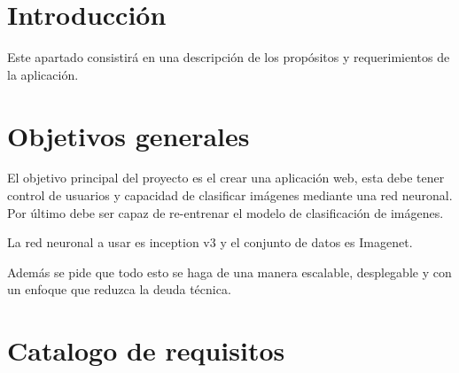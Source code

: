 
\section{Introducción}
Este apartado consistirá en una descripción de los propósitos y requerimientos de la aplicación.

\section{Objetivos generales}
El objetivo principal del proyecto es el crear una aplicación web, esta debe tener control de usuarios y capacidad de clasificar imágenes mediante una red neuronal. Por último debe ser capaz de re-entrenar el modelo de clasificación de imágenes.

La red neuronal a usar es inception v3 y el conjunto de datos es Imagenet.

Además se pide que todo esto se haga de una manera escalable, desplegable y con un enfoque que reduzca la deuda técnica.

\section{Catalogo de requisitos}
